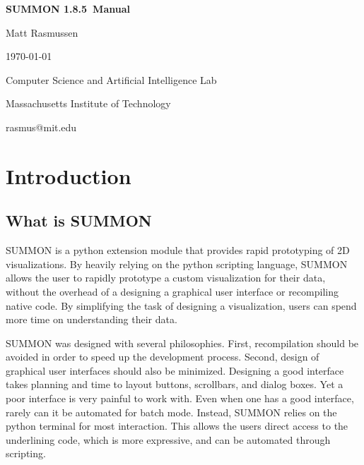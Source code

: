 \documentclass[12pt]{article}
\newcommand{\version}{1.8.5}
\begin{document}
\begin{titlepage}

\begin{center}

\vspace*{2.5in}

{\huge \bf {}\selectfont 
SUMMON \version\ Manual
}
\vspace*{.5in}

{\large
Matt Rasmussen

\today
}
\vspace*{.5in}

Computer Science and Artificial Intelligence Lab

Massachusetts Institute of Technology

\vspace*{.25in}

rasmus@mit.edu
\end{center}

\end{titlepage}


\tableofcontents

\clearpage

\section{Introduction}
\label{sec:intro}


\subsection{What is SUMMON}

SUMMON is a python extension module that provides rapid prototyping of 2D
visualizations.  By heavily relying on the python scripting language, SUMMON
allows the user to rapidly prototype a custom visualization for their data, 
without the overhead of a designing a graphical user interface or recompiling 
native code.  By simplifying the task of designing a visualization, users can 
spend more time on understanding their data. 

SUMMON was designed with several philosophies.  First, recompilation should
be avoided in order to speed up the development process.  Second, design of
graphical user interfaces should also be minimized.  Designing a good interface
takes planning and time to layout buttons, scrollbars, and dialog boxes.  Yet a 
poor interface is very painful to work with. Even when one has a good interface,
rarely can it be automated for batch mode.  Instead, SUMMON relies on the python
terminal for most interaction.  This allows the users direct access to  the
underlining code, which is more expressive, and can be automated through
scripting.  
\end{document}
